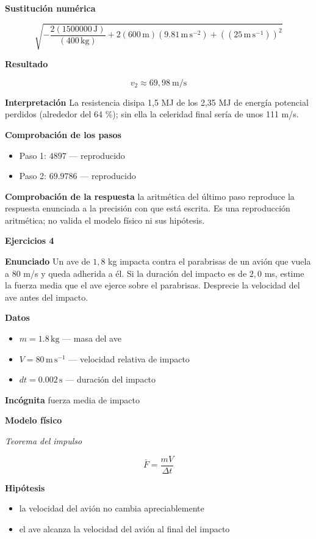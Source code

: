 \documentclass[10pt,openany]{book}
\begin{document}
\noindent\textbf{Sustitución numérica}

\[
\sqrt{- \frac{2 \left(1500000\,\mathrm{J}\right)}{\left(400\,\mathrm{kg}\right)} + 2 \left(600\,\mathrm{m}\right) \left(9.81\,\mathrm{m}\,\mathrm{s}^{-2}\right) + \left(\left(25\,\mathrm{m}\,\mathrm{s}^{-1}\right)\right)^{2}}
\]

\noindent\textbf{Resultado}

\[
v_2 \approx 69{,}98\ \mathrm{m/s}
\]

\noindent\textbf{Interpretación}
La resistencia disipa 1,5 MJ de los 2,35 MJ de energía potencial perdidos (alrededor del 64 \%); sin ella la celeridad final sería de unos 111 m/s.

\noindent\textbf{Comprobación de los pasos}
\begin{itemize}
\item Paso 1: $4897$ — reproducido
\item Paso 2: $69.9786$ — reproducido
\end{itemize}

\noindent\textbf{Comprobación de la respuesta} la aritmética del último paso reproduce la respuesta enunciada a la precisión con que está escrita. Es una reproducción aritmética; no valida el modelo físico ni sus hipótesis.

\noindent\textbf{Ejercicios 4}

\noindent\textbf{Enunciado}
Un ave de \(1{,}8\) kg impacta contra el parabrisas de un avión que vuela a 80 m/s y queda adherida a él. Si la duración del impacto es de \(2{,}0\) ms, estime la fuerza media que el ave ejerce sobre el parabrisas. Desprecie la velocidad del ave antes del impacto.

\noindent\textbf{Datos}
\begin{itemize}
\item $m = 1.8\,\mathrm{kg}$ — masa del ave
\item $V = 80\,\mathrm{m}\,\mathrm{s}^{-1}$ — velocidad relativa de impacto
\item $dt = 0.002\,\mathrm{s}$ — duración del impacto
\end{itemize}

\noindent\textbf{Incógnita}
fuerza media de impacto

\noindent\textbf{Modelo físico}

\noindent\textit{Teorema del impulso}

\[
\bar{F} = \frac{m V}{\Delta t}
\]

\noindent\textbf{Hipótesis}
\begin{itemize}
\item la velocidad del avión no cambia apreciablemente
\item el ave alcanza la velocidad del avión al final del impacto
\end{itemize}
\end{document}
